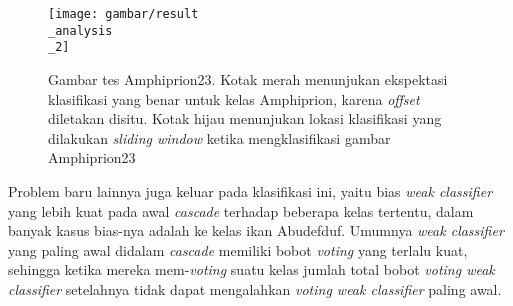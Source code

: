 		\begin{figure}[H]
			\centering{}
			  \texttt{[image: gambar/result\\\_analysis\\\_2]}
			\caption{Gambar tes Amphiprion23. Kotak merah menunjukan ekspektasi klasifikasi 
			yang benar untuk kelas Amphiprion, karena \textit{offset} diletakan disitu. Kotak 
			hijau menunjukan lokasi klasifikasi yang dilakukan \emph{sliding window} ketika mengklasifikasi 
			gambar Amphiprion23}
		\end{figure}
		
		Problem baru lainnya juga keluar pada klasifikasi ini, yaitu 
		bias \emph{weak classifier} yang lebih kuat pada awal \emph{cascade} terhadap beberapa kelas tertentu, dalam 
		banyak kasus bias-nya adalah ke kelas ikan Abudefduf. Umumnya \emph{weak classifier} yang paling awal 
		didalam \emph{cascade} memiliki bobot \textit{voting} yang terlalu kuat, sehingga ketika mereka mem-\textit{voting} 
		suatu kelas jumlah total bobot \textit{voting weak classifier} setelahnya tidak dapat mengalahkan 
		\textit{voting weak classifier} paling awal.
		
		

\begin{comment}

\end{comment}
